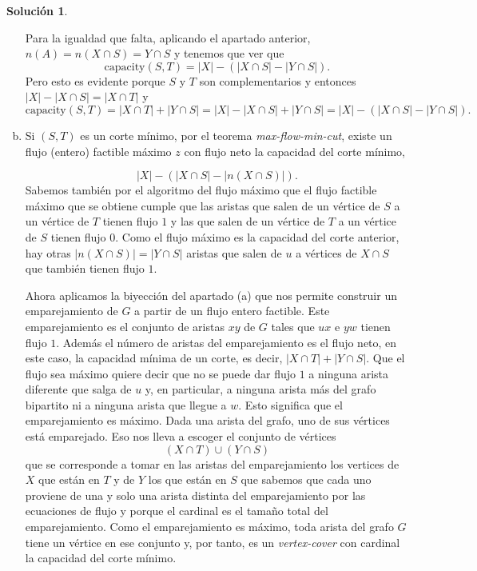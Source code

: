 \documentclass[10pt]{article}
\theoremstyle{definition}
\newtheorem*{sol}{Solución}
\begin{document}
\begin{sol}
\begin{enumerate}[(a)]
Para la igualdad que falta, aplicando el apartado anterior, $n(A)=n(X\cap S)=Y\cap S$ y tenemos que ver que 
$$\text{capacity}(S,T)=|X|-(|X\cap S|-|Y\cap S|).$$
Pero esto es evidente porque $S$ y $T$ son complementarios y entonces $|X|-|X\cap S|=|X\cap T|$ y
$$\text{capacity}(S,T)=|X\cap T|+|Y\cap S|=|X|-|X\cap S|+|Y\cap S|=|X|-(|X\cap S|-|Y\cap S|).$$
\item Si $(S,T)$ es un corte mínimo, por el teorema \textit{max-flow-min-cut}, existe un flujo (entero) factible máximo $z$ con flujo neto la capacidad del corte mínimo,

$$|X|-(|X\cap S|-|n(X\cap S)|).$$
Sabemos también por el algoritmo del flujo máximo que el flujo factible máximo que se obtiene cumple que las aristas que salen de un vértice de $S$ a un vértice de $T$ tienen flujo $1$ y las que salen de un vértice de $T$ a un vértice de $S$ tienen flujo $0$. Como el flujo máximo es la capacidad del corte anterior, hay otras $|n(X\cap S)|=|Y\cap S|$ aristas que salen de $u$ a vértices de $X\cap S$ que también tienen flujo $1$.

Ahora aplicamos la biyección del apartado (a) que nos permite construir un emparejamiento de $G$ a partir de un flujo entero factible. Este emparejamiento es el conjunto de aristas $xy$ de $G$ tales que $ux$ e $yw$ tienen flujo $1$. Además el número de aristas del emparejamiento es el flujo neto, en este caso, la capacidad mínima de un corte, es decir, $|X\cap T|+|Y\cap S|$. Que el flujo sea máximo quiere decir que no se puede dar flujo $1$ a ninguna arista diferente que salga de $u$ y, en particular, a ninguna arista más del grafo bipartito ni a ninguna arista que llegue a $w$. Esto significa que el emparejamiento es máximo. Dada una arista del grafo, uno de sus vértices está emparejado. Eso nos lleva a escoger el conjunto de vértices
$$(X\cap T)\cup(Y\cap S)$$
que se corresponde a tomar en las aristas del emparejamiento los vertices de $X$ que están en $T$ y de $Y$ los que están en $S$ que sabemos que cada uno proviene de una y solo una arista distinta del emparejamiento por las ecuaciones de flujo y porque el cardinal es el tamaño total del emparejamiento. Como el emparejamiento es máximo, toda arista del grafo $G$ tiene un vértice en ese conjunto y, por tanto, es un \textit{vertex-cover} con cardinal la capacidad del corte mínimo.
\end{enumerate}
\end{sol}
\end{document}
